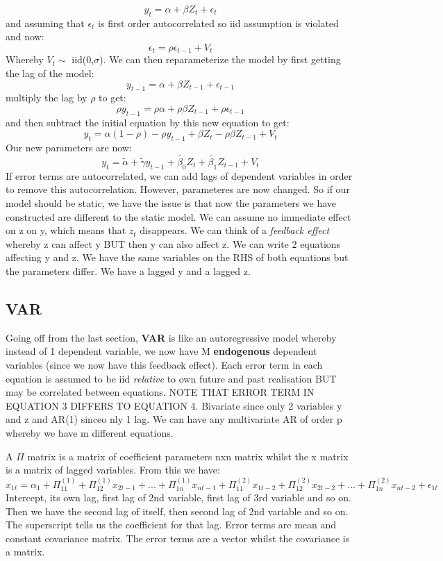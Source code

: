 \documentclass[11pt, oneside]{article}
\theoremstyle{definition}
\begin{document}
$$
y_t = \alpha + \beta Z_t + \epsilon_t
$$
and assuming that $\epsilon_t$ is first order autocorrelated so iid assumption is violated and now:
$$
\epsilon_t = \rho \epsilon_{t-1} + V_t
$$
Whereby $V_t \sim$ iid(0,$\sigma$). We can then reparameterize the model by first getting the lag of the model:
$$
y_{t-1} = \alpha + \beta Z_{t-1} + \epsilon_{t-1}
$$
multiply the lag by $\rho$ to get:
$$
\rho y_{t-1} = \rho \alpha + \rho \beta Z_{t-1} + \rho \epsilon_{t-1}
$$
and then subtract the initial equation by this new equation to get:
$$
y_t = \alpha(1-\rho) - \rho y_{t-1} + \beta Z_t - \rho \beta Z_{t-1} + V_t
$$
Our new parameters are now:
$$
y_t = \tilde{\alpha} + \tilde{\gamma} y_{t-1} + \tilde{\beta_0} Z_t + \tilde{\beta_1} Z_{t-1} + V_t
$$
If error terms are autocorrelated, we can add lags of dependent variables in order to remove this autocorrelation. However, parameteres are now changed. So if our model should be static, we have the issue is that now the parameters we have constructed are different to the static model. We can assume no immediate effect on z on y, which means that $z_t$ disappears. We can think of a \textit{feedback effect} whereby z can affect y BUT then y can also affect z. We can write 2 equations affecting y and z. We have the same variables on the RHS of both equations but the parameters differ. We have a lagged y and a lagged z.

\subsection{VAR}

Going off from the last section, \textbf{VAR} is like an autoregressive model whereby instead of 1 dependent variable, we now have M \textbf{endogenous} dependent variables (since we now have this feedback effect). Each error term in each equation is assumed to be iid \textit{relative} to own future and past realisation BUT may be correlated between equations. NOTE THAT ERROR TERM IN EQUATION 3 DIFFERS TO EQUATION 4. Bivariate since only 2 variables y and z and AR(1) sinceo nly 1 lag. We can have any multivariate AR of order p whereby we have m different equations.

A $\Pi$ matrix is a matrix of coefficient parameters nxn matrix whilst the x matrix is a matrix of lagged variables. From this we have:
$$
x_{1t} = \alpha_1 + \Pi_{11}^{(1)} + \Pi_{12}^{(1)}x_{2t-1} + ... + \Pi_{1n}^{(1)}x_{nt-1} + \Pi_{11}^{(2)}x_{1t-2} + \Pi_{12}^{(2)}x_{2t-2} + ... +  \Pi_{1n}^{(2)}x_{nt-2} + \epsilon_{1t}
$$
Intercept, its own lag, first lag of 2nd variable, first lag of 3rd variable and so on. Then we have the second lag of itself, then second lag of 2nd variable and so on. The superscript tells us the coefficient for that lag. Error terms are mean and constant covariance matrix. The error terms are a vector whilst the covariance is a matrix.
\end{document}
